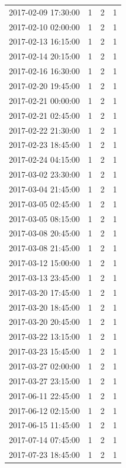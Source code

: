 \begin{tabular}{lrrr}
2017-02-09 17:30:00 & 1 & 2 & 1 \\
2017-02-10 02:00:00 & 1 & 2 & 1 \\
2017-02-13 16:15:00 & 1 & 2 & 1 \\
2017-02-14 20:15:00 & 1 & 2 & 1 \\
2017-02-16 16:30:00 & 1 & 2 & 1 \\
2017-02-20 19:45:00 & 1 & 2 & 1 \\
2017-02-21 00:00:00 & 1 & 2 & 1 \\
2017-02-21 02:45:00 & 1 & 2 & 1 \\
2017-02-22 21:30:00 & 1 & 2 & 1 \\
2017-02-23 18:45:00 & 1 & 2 & 1 \\
2017-02-24 04:15:00 & 1 & 2 & 1 \\
2017-03-02 23:30:00 & 1 & 2 & 1 \\
2017-03-04 21:45:00 & 1 & 2 & 1 \\
2017-03-05 02:45:00 & 1 & 2 & 1 \\
2017-03-05 08:15:00 & 1 & 2 & 1 \\
2017-03-08 20:45:00 & 1 & 2 & 1 \\
2017-03-08 21:45:00 & 1 & 2 & 1 \\
2017-03-12 15:00:00 & 1 & 2 & 1 \\
2017-03-13 23:45:00 & 1 & 2 & 1 \\
2017-03-20 17:45:00 & 1 & 2 & 1 \\
2017-03-20 18:45:00 & 1 & 2 & 1 \\
2017-03-20 20:45:00 & 1 & 2 & 1 \\
2017-03-22 13:15:00 & 1 & 2 & 1 \\
2017-03-23 15:45:00 & 1 & 2 & 1 \\
2017-03-27 02:00:00 & 1 & 2 & 1 \\
2017-03-27 23:15:00 & 1 & 2 & 1 \\
2017-06-11 22:45:00 & 1 & 2 & 1 \\
2017-06-12 02:15:00 & 1 & 2 & 1 \\
2017-06-15 11:45:00 & 1 & 2 & 1 \\
2017-07-14 07:45:00 & 1 & 2 & 1 \\
2017-07-23 18:45:00 & 1 & 2 & 1 \\
\bottomrule
\end{tabular}
